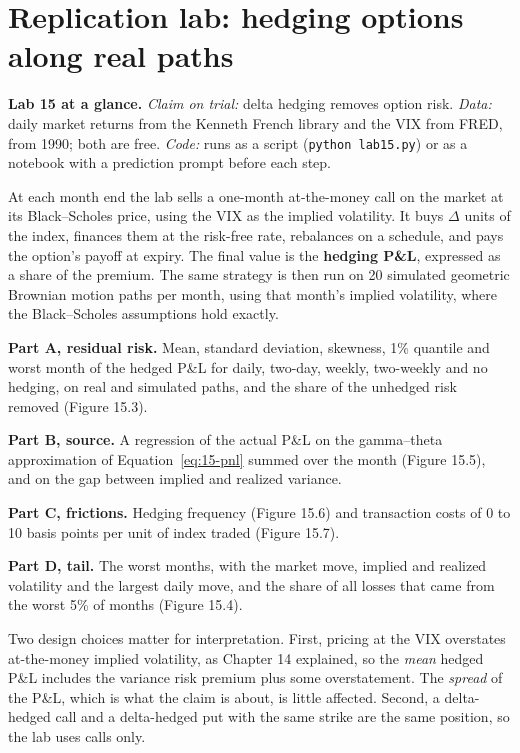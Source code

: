 \section{Replication lab: hedging options along real paths}
\label{sec:15-lab}

\begin{callout}
\textbf{Lab 15 at a glance.} \emph{Claim on trial:} delta hedging removes option risk. \emph{Data:} daily market returns from the Kenneth French library and the VIX from FRED, from 1990; both are free. \emph{Code:} runs as a script (\texttt{python lab15.py}) or as a notebook with a prediction prompt before each step.
\end{callout}

At each month end the lab sells a one-month at-the-money call on the market at its Black--Scholes price, using the VIX as the implied volatility. It buys $\Delta$ units of the index, finances them at the risk-free rate, rebalances on a schedule, and pays the option's payoff at expiry. The final value is the \textbf{hedging P\&L}, expressed as a share of the premium. The same strategy is then run on 20 simulated geometric Brownian motion paths per month, using that month's implied volatility, where the Black--Scholes assumptions hold exactly.

\textbf{Part A, residual risk.} Mean, standard deviation, skewness, 1\% quantile and worst month of the hedged P\&L for daily, two-day, weekly, two-weekly and no hedging, on real and simulated paths, and the share of the unhedged risk removed (Figure 15.3).

\textbf{Part B, source.} A regression of the actual P\&L on the gamma--theta approximation of Equation~\eqref{eq:15-pnl} summed over the month (Figure 15.5), and on the gap between implied and realized variance.

\textbf{Part C, frictions.} Hedging frequency (Figure 15.6) and transaction costs of 0 to 10 basis points per unit of index traded (Figure 15.7).

\textbf{Part D, tail.} The worst months, with the market move, implied and realized volatility and the largest daily move, and the share of all losses that came from the worst 5\% of months (Figure 15.4).

Two design choices matter for interpretation. First, pricing at the VIX overstates at-the-money implied volatility, as Chapter 14 explained, so the \emph{mean} hedged P\&L includes the variance risk premium plus some overstatement. The \emph{spread} of the P\&L, which is what the claim is about, is little affected. Second, a delta-hedged call and a delta-hedged put with the same strike are the same position, so the lab uses calls only.


